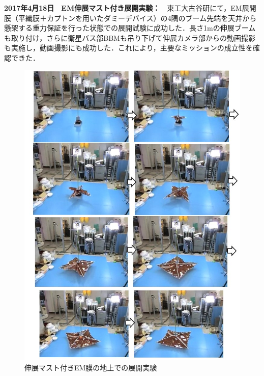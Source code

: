 \noindent \textbf{2017年4月18日　EM伸展マスト付き展開実験：}　東工大古谷研にて，EM展開膜（平織膜＋カプトンを用いたダミーデバイス）の4隅のブーム先端を天井から懸架する重力保証を行った状態での展開試験に成功した．長さ1mの伸展ブームも取り付け，さらに衛星バス部BBMも吊り下げて伸展カメラ部からの動画撮影も実施し，動画撮影にも成功した．これにより，主要なミッションの成立性を確認できた．　
\begin{figure}[H]
	\centering
	\includegraphics[width=.8\textwidth]{03/fig/3-9-3-1-5.jpg}
	\caption{伸展マスト付きEM膜の地上での展開実験}
	\label{fig3-9-3-1-5}
\end{figure}

